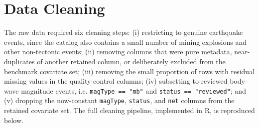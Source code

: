 \documentclass[11pt]{article}
\begin{document}
\section{Data Cleaning}

The raw data required six cleaning steps: (i) restricting to genuine earthquake
events, since the catalog also contains a small number of mining explosions and
other non-tectonic events; (ii) removing columns that were pure metadata,
near-duplicates of another retained column, or deliberately excluded from the
benchmark covariate set; (iii) removing the small proportion of rows with
residual missing values in the quality-control columns; (iv) subsetting to
reviewed body-wave magnitude events, i.e. \texttt{magType == "mb"} and
\texttt{status == "reviewed"}; and (v) dropping the now-constant
\texttt{magType}, \texttt{status}, and \texttt{net} columns from the retained covariate set.
The full cleaning pipeline, implemented in R, is reproduced below.
\end{document}
